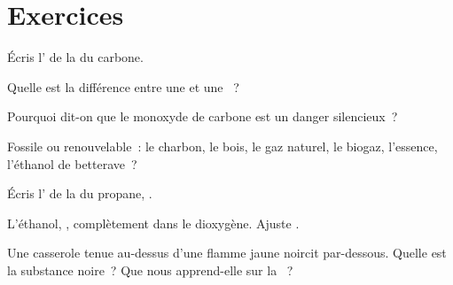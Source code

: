 \section{Exercices}

\begin{exercise}[$\star$]\label{exo:g8:combustion-and-fuels:1}
Écris l' de la  du carbone.
\end{exercise}

\begin{exercise}[$\star$]\label{exo:g8:combustion-and-fuels:2}
Quelle est la différence entre une  et une ~?
\end{exercise}

\begin{exercise}[$\star$]\label{exo:g8:combustion-and-fuels:3}
Pourquoi dit-on que le monoxyde de carbone est un danger silencieux~?
\end{exercise}

\begin{exercise}[$\star$]\label{exo:g8:combustion-and-fuels:4}
Fossile ou renouvelable~: le charbon, le bois, le gaz naturel, le
biogaz, l'essence, l'éthanol de betterave~?
\end{exercise}

\begin{exercise}[$\star\star$]\label{exo:g8:combustion-and-fuels:5}
Écris l' de la  du propane,
.
\end{exercise}

\begin{exercise}[$\star\star$]\label{exo:g8:combustion-and-fuels:6}
L'éthanol, ,  complètement dans le dioxygène. Ajuste
. %
\end{exercise}

\begin{exercise}[$\star\star$]\label{exo:g8:combustion-and-fuels:7}
Une casserole tenue au-dessus d'une flamme jaune noircit par-dessous.
Quelle est la substance noire~? Que nous apprend-elle sur la
~?
\end{exercise}

